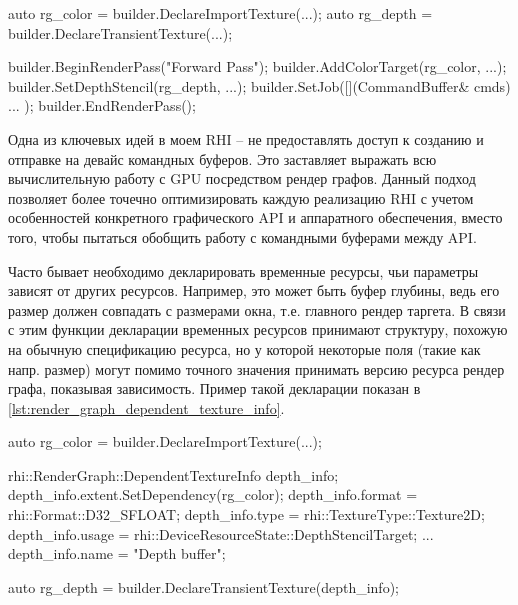 \begin{minipage}[h]{0.95\textwidth}
\centering
\begin{cpp}[language=C++, caption={Пример декларации графической вершины рендер графа.}, label={lst:render_graph_declaration}]
auto rg_color = builder.DeclareImportTexture(...);
auto rg_depth = builder.DeclareTransientTexture(...);

builder.BeginRenderPass("Forward Pass");
builder.AddColorTarget(rg_color, ...);
builder.SetDepthStencil(rg_depth, ...);
builder.SetJob([](CommandBuffer& cmds) {
    ...
});
builder.EndRenderPass();
\end{cpp}
\end{minipage}

Одна из ключевых идей в моем RHI -- не предоставлять доступ к созданию и отправке на девайс командных буферов. Это заставляет выражать всю вычислительную работу с GPU посредством рендер графов. Данный подход позволяет более точечно оптимизировать каждую реализацию RHI с учетом особенностей конкретного графического API и аппаратного обеспечения, вместо того, чтобы пытаться обобщить работу с командными буферами между API.

Часто бывает необходимо декларировать временные ресурсы, чьи параметры зависят от других ресурсов. Например, это может быть буфер глубины, ведь его размер должен совпадать с размерами окна, т.е. главного рендер таргета. В связи с этим функции декларации временных ресурсов принимают структуру, похожую на обычную спецификацию ресурса, но у которой некоторые поля (такие как напр. размер) могут помимо точного значения принимать версию ресурса рендер графа, показывая зависимость. Пример такой декларации показан в \ref{lst:render_graph_dependent_texture_info}.

\begin{minipage}[h]{0.95\textwidth}
\centering
\begin{cpp}[language=C++, caption={Пример декларации зависимых временных ресурсов.}, label={lst:render_graph_dependent_texture_info}]
auto rg_color = builder.DeclareImportTexture(...);

rhi::RenderGraph::DependentTextureInfo depth_info{};
depth_info.extent.SetDependency(rg_color);
depth_info.format = rhi::Format::D32_SFLOAT;
depth_info.type   = rhi::TextureType::Texture2D;
depth_info.usage  = rhi::DeviceResourceState::DepthStencilTarget;
...
depth_info.name   = "Depth buffer";

auto rg_depth = builder.DeclareTransientTexture(depth_info);
\end{cpp}
\end{minipage}

